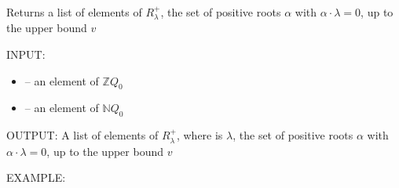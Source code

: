 \documentclass[letterpaper,10pt,english]{sphinxmanual}
\begin{document}
\begin{fulllineitems}
\label{\detokenize{index:quivercombinatorics.quivercombinatorics.Quiver.R_lambda_plus}}
\pysigstartsignatures
\pysiglinewithargsret
{}
{\sphinxparamcomma {}}
{}
\pysigstopsignatures
\sphinxAtStartPar
Returns a list of elements of \(R_\lambda^+\), the set of positive roots \(\alpha\) with \(\alpha\cdot\lambda=0\), up to the upper bound \(v\)

\sphinxAtStartPar
INPUT:
\begin{itemize}
\item {} 
\sphinxAtStartPar
{} – an element of \(\mathbb{Z}Q_0\)

\item {} 
\sphinxAtStartPar
{} – an element of \(\mathbb{N}Q_0\)

\end{itemize}

\sphinxAtStartPar
OUTPUT: A list of elements of \(R_\lambda^+\), where  is \(\lambda\), the set of positive roots \(\alpha\) with \(\alpha\cdot\lambda=0\), up to the upper bound \(v\)

\sphinxAtStartPar
EXAMPLE:

\begin{sphinxVerbatim}[commandchars=\\\{\}]
  
   \PYG{p}{[}\PYG{p}{[} \PYG{p}{]} \PYG{p}{[} \PYG{p}{]}\PYG{p}{]}
    
\PYG{p}{[}       \PYG{p}{]}
\end{sphinxVerbatim}

\end{fulllineitems}
\end{document}
